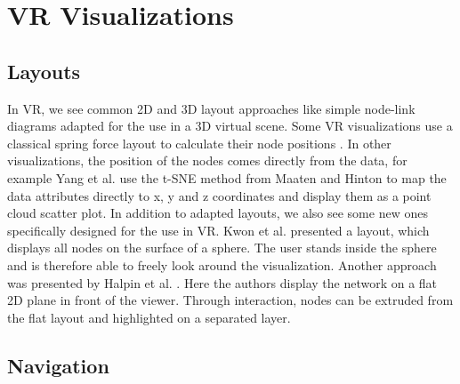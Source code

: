\section{VR Visualizations}
\label{chap:rw-VRVIS}
\subsection{Layouts}
\label{chap:rw-vrlayouts}
In VR, we see common 2D and 3D layout approaches like simple node-link diagrams adapted for the use in a 3D virtual scene. 
Some VR visualizations use a classical spring force layout to calculate their node positions \cite{drogemuller_examining_2020} \cite{sorger_immersive_2019}.
In other visualizations, the position of the nodes comes directly from the data, for example Yang et al. \cite{yang_embodied_2020} use the t-SNE method from Maaten and Hinton \cite{maaten_visualizing_2008} to map the data attributes directly to x, y and z coordinates and display them as a point cloud scatter plot.
In addition to adapted layouts, we also see some new ones specifically designed for the use in VR. Kwon et al. \cite{kwon_study_2016} presented a layout, which displays all nodes on the surface of a sphere. The user stands inside the sphere and is therefore able to freely look around the visualization. Another approach was presented by Halpin et al. \cite{halpin_exploring_2008}. Here the authors display the network on a flat 2D plane in front of the viewer. Through interaction, nodes can be extruded from the flat layout and highlighted on a separated layer.     

\subsection{Navigation}
\label{chap:rw-vrnavigation}

